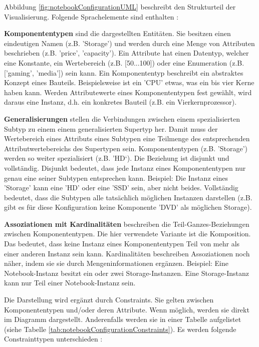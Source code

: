 \documentclass[12pt,a4paper,bibliography=totocnumbered,listof=totoc]{scrartcl}
\begin{document}
Abbildung \ref{fig:notebookConfigurationUML} beschreibt den Strukturteil der Visualisierung. Folgende Sprachelemente sind enthalten \citep{felferning14}:
\begin{compactitem}
\item \textbf{Komponententypen} sind die dargestellten Entitäten. Sie besitzen einen eindeutigen Namen (z.B. 'Storage') und werden durch eine Menge von Attributen beschrieben (z.B. 'price', 'capacity'). Ein Attribute hat einen Datentyp, welcher eine Konstante, ein Wertebereich (z.B. [50...100]) oder eine Enumeration (z.B. ['gaming', 'media']) sein kann. Ein Komponententyp beschreibt ein abstraktes Konzept eines Bauteils. Beispielsweise ist ein 'CPU' etwas, was ein bis vier Kerne haben kann. Werden Attributewerte eines Komponententypen fest gewählt, wird daraus eine Instanz, d.h. ein konkretes Bauteil (z.B. ein Vierkernprozessor).
\item \textbf{Generalisierungen} stellen die Verbindungen zwischen einem spezialisierten Subtyp zu einem einem generalisierten Supertyp her. Damit muss der Wertebereich eines Attributs eines Subtypen eine Teilmenge des entsprechenden Attributwertebereichs des Supertypen sein. Komponententypen (z.B. 'Storage') werden so weiter spezialisiert (z.B. 'HD‘). Die Beziehung ist disjunkt und vollständig. Disjunkt bedeutet, dass jede Instanz eines Komponententypen nur genau eine seiner Subtypen entsprechen kann. Beispiel: Die Instanz eines 'Storage' kann eine 'HD' oder eine 'SSD' sein, aber nicht beides. Vollständig bedeutet, dass die Subtypen alle tatsächlich möglichen Instanzen darstellen (z.B. gibt es für diese Konfiguration keine Komponente 'DVD' als möglichen Storage).
\item \textbf{Assoziationen mit Kardinalitäten} beschreiben die Teil-Ganzes-Beziehungen zwischen Komponententypen. Die hier verwendete Variante ist die Komposition. Das bedeutet, dass keine Instanz eines Komponententypen Teil von mehr als einer anderen Instanz sein kann. Kardinalitäten beschreiben Assoziationen noch näher, indem sie sie durch Mengeninformationen ergänzen. Beispiel: Eine Notebook-Instanz besitzt ein oder zwei Storage-Instanzen. Eine Storage-Instanz kann nur Teil einer Notebook-Instanz sein.
\end{compactitem}

Die Darstellung wird ergänzt durch Constraints. Sie gelten zwischen Komponententypen und/oder deren Attribute. Wenn möglich, werden sie direkt im Diagramm dargestellt. Anderenfalls werden sie in einer Tabelle aufgelistet (siehe Tabelle \ref{tab:notebookConfigurationConstraints}). Es werden folgende Constrainttypen unterschieden \citep{felferning14}:
\end{document}
